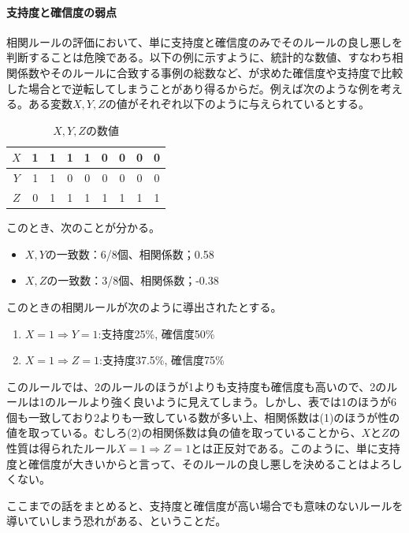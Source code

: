 \documentclass[dvipdfmx]{jsarticle}
\begin{document}
\paragraph{支持度と確信度の弱点}
相関ルールの評価において、単に支持度と確信度のみでそのルールの良し悪しを判断することは危険である。以下の例に示すように、統計的な数値、すなわち相関係数やそのルールに合致する事例の総数など、が求めた確信度や支持度で比較した場合とで逆転してしまうことがあり得るからだ。例えば次のような例を考える。ある変数$X, Y, Z$の値がそれぞれ以下のように与えられているとする。
\begin{table}[H]
  \begin{center}
    \caption{$X,Y,Z$の数値}
    \begin{tabular}{|c|c|c|c|c|c|c|c|c|} \hline
      $X$&1&1&1&1&0&0&0&0 \\ \hline
      $Y$&1&1&0&0&0&0&0&0 \\ \hline
      $Z$&0&1&1&1&1&1&1&1 \\ \hline
    \end{tabular}
    \label{hyo01}
  \end{center}
\end{table}
このとき、次のことが分かる。
\begin{itemize}
  \item $X,Y$の一致数：6/8個、相関係数；0.58
  \item $X,Z$の一致数：3/8個、相関係数；-0.38
\end{itemize}
このときの相関ルールが次のように導出されたとする。
\begin{enumerate}
  \item $X=1 \Rightarrow Y = 1$:支持度25\%, 確信度50\%
  \item $X=1 \Rightarrow Z = 1$:支持度37.5\%, 確信度75\%
\end{enumerate}
このルールでは、2のルールのほうが1よりも支持度も確信度も高いので、2のルールは1のルールより強く良いように見えてしまう。しかし、表では1のほうが6個も一致しており2よりも一致している数が多い上、相関係数は(1)のほうが性の値を取っている。むしろ(2)の相関係数は負の値を取っていることから、$XとZ$の性質は得られたルール$X=1 \Rightarrow Z=1$とは正反対である。このように、単に支持度と確信度が大きいからと言って、そのルールの良し悪しを決めることはよろしくない。\par
ここまでの話をまとめると、支持度と確信度が高い場合でも意味のないルールを導いていしまう恐れがある、ということだ。
\end{document}
